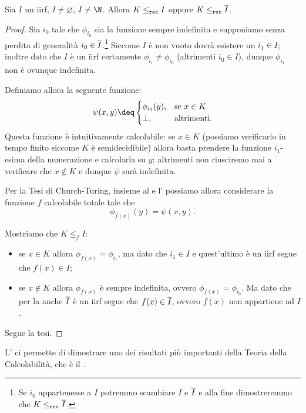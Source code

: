 \begin{theorem}
    Sia $I$ un iirf, $I \neq \varnothing$, $I \neq \N$. Allora $K \leq_{\texttt{rec}} I$ oppure $K \leq_{\texttt{rec}} \overline{I}$.   
\end{theorem}
\begin{proof}
    Sia $i_0$ tale che $\phi_{i_0}$ sia la funzione sempre indefinita e supponiamo senza perdita di generalità $i_0 \in \overline{I}$.\footnote{Se $i_0$ appartenesse a $I$ potremmo scambiare $I$ e $\overline{I}$ e alla fine dimostreremmo che $K \leq_{\texttt{rec}} \overline{I}$.} Siccome $I$ è non vuoto dovrà esistere un $i_1 \in I$; inoltre dato che $I$ è un iirf certamente $\phi_{i_1} \neq \phi_{i_0}$ (altrimenti $i_0 \in I$), dunque $\phi_{i_1}$ non è ovunque indefinita.  

    Definiamo allora la seguente funzione: \[
        \psi(x, y) \deq \begin{cases}
            \phi_{i_1}(y),  &\text{se } x \in K\\
            \bot,           &\text{altrimenti.}
        \end{cases}
    \] Questa funzione è intuitivamente calcolabile: se $x \in K$ (possiamo verificarlo in tempo finito siccome $K$ è semidecidibile) allora basta prendere la funzione $i_1$-esima della numerazione e calcolarla su $y$; altrimenti non riusciremo mai a verificare che $x \notin K$ e dunque $\psi$ sarà indefinita.
    
    Per la Tesi di Church-Turing, insieme al  e l' possiamo allora considerare la funzione $f$ calcolabile totale tale che \[
        \phi_{f(x)}(y) = \psi(x, y).
    \]

    Mostriamo che $K \leq_f I$: \begin{itemize}
        \item se $x \in K$ allora $\phi_{f(x)} = \phi_{i_1}$, ma dato che $i_1 \in I$ e quest'ultimo è un iirf segue che $f(x) \in I$;
        \item se $x \notin K$ allora $\phi_{f(x)}$ è sempre indefinita, ovvero $\phi_{f(x)} = \phi_{i_0}$. Ma dato che per la  anche $\overline{I}$ è un iirf segue che $f(x) \in \overline{I}$, ovvero $f(x)$ non appartiene ad $I$.   
    \end{itemize} 
    Segue la tesi.
\end{proof}

L' ci permette di dimostrare uno dei risultati più importanti della Teoria della Calcolabilità, che è il .

